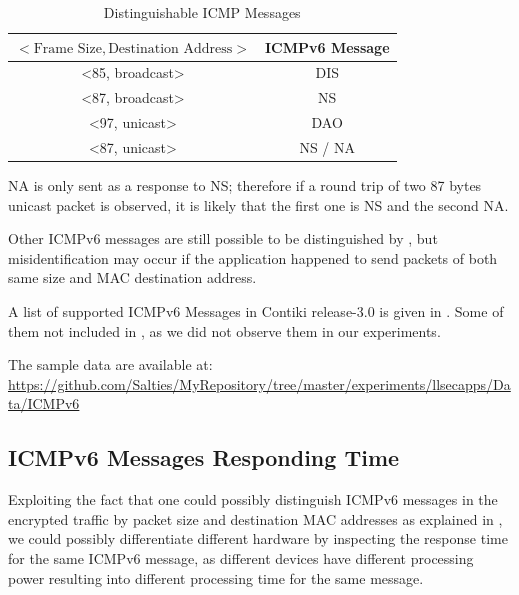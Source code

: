 \begin{table}[ht!]
	\centering
	\begin{tabular}{|c|c|}
		\hline
		$<\text{Frame Size}, \text{Destination Address}>$                     & ICMPv6 Message \\ \hline
		\textless85, broadcast\textgreater & DIS            \\ \hline
		\textless87, broadcast\textgreater & NS             \\ \hline
		\textless97, unicast\textgreater   & DAO            \\ \hline
		\textless87, unicast\textgreater   & NS / NA        \\ \hline
	\end{tabular}
	\caption{Distinguishable ICMP Messages}
	\label{Tbl: Distinguishable ICMP Messages}
\end{table}

NA is only sent as a response to NS; therefore if a round trip of two 87 bytes unicast packet is observed, it is likely that the first one is NS and the second NA.  

Other ICMPv6 messages are still possible to be distinguished by , but misidentification may occur if the application happened to send packets of both same size and MAC destination address.

A list of supported ICMPv6 Messages in Contiki release-3.0 is given in . Some of them not included in , as we did not observe them in our experiments.

The sample data are available at:\\
\url{https://github.com/Salties/MyRepository/tree/master/experiments/llsecapps/Data/ICMPv6}

\subsection{ICMPv6 Messages Responding Time}

Exploiting the fact that one could possibly distinguish ICMPv6 messages in the encrypted traffic by packet size and destination MAC addresses as explained in , we could possibly  differentiate different hardware by inspecting the response time for the same ICMPv6 message, as different devices have different processing power resulting into different processing time for the same message.

